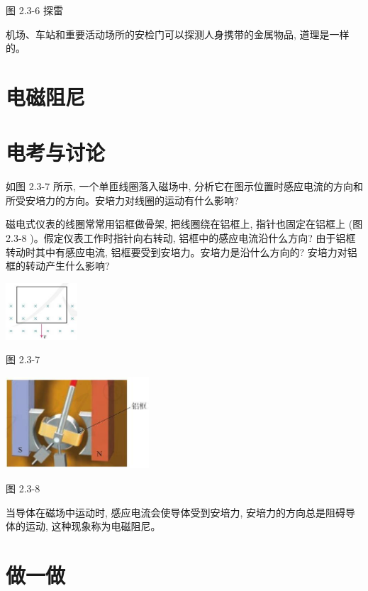 \documentclass[10pt]{article}
\begin{document}
图 2.3-6 探雷

机场、车站和重要活动场所的安检门可以探测人身携带的金属物品, 道理是一样的。

\section*{电磁阻尼}

\section*{电考与讨论}

如图 2.3-7 所示, 一个单匝线圈落入磁场中, 分析它在图示位置时感应电流的方向和所受安培力的方向。安培力对线圈的运动有什么影响?

磁电式仪表的线圈常常用铝框做骨架, 把线圈绕在铝框上, 指针也固定在铝框上 (图 2.3-8 )。假定仪表工作时指针向右转动, 铝框中的感应电流沿什么方向? 由于铝框转动时其中有感应电流, 铝框要受到安培力。安培力是沿什么方向的? 安培力对铝框的转动产生什么影响?

\begin{center}
\includegraphics[max width=0.2\textwidth]{images/01910e72-c5b7-7ed5-a6d4-fb3a5faefc32_42_819012.jpg}
\end{center}

图 2.3-7

\begin{center}
\includegraphics[max width=0.4\textwidth]{images/01910e72-c5b7-7ed5-a6d4-fb3a5faefc32_42_595309.jpg}
\end{center}

图 2.3-8

当导体在磁场中运动时, 感应电流会使导体受到安培力, 安培力的方向总是阻碍导体的运动, 这种现象称为电磁阻尼。

\section*{做一做}
\end{document}

